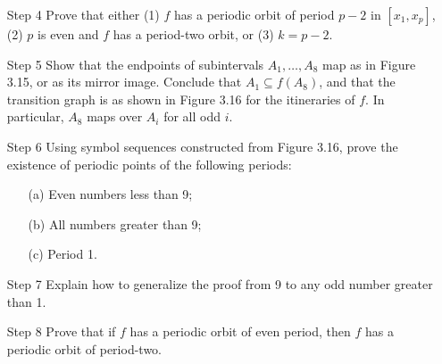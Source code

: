 \documentclass[12pt,letterpaper,reqno]{amsart}
\begin{document}
\begin{enumerate}
\begin{enumerate}
\begin{flushleft}
    \end{flushleft}
    
    \item[Step 4] Prove that either (1) $f$ has a periodic orbit of period $p-2$ in $[x_1, x_p]$, (2) $p$ is even and $f$ has a period-two orbit, or (3) $k = p - 2$.
    \begin{flushleft}
    
    \end{flushleft}
    
    \item[Step 5] Show that the endpoints of subintervals $A_1, \ldots , A_8$ map as in Figure 3.15, or as its mirror image. Conclude that $A_1 \subseteq f(A_8)$, and that the transition graph is as shown in Figure 3.16 for the itineraries of $f$. In particular, $A_8$ maps over $A_i$ for all odd $i$.
    \begin{flushleft}
    
    \end{flushleft}
    
    \item[Step 6] Using symbol sequences constructed from Figure 3.16, prove the existence of periodic points of the following periods:\newline
    \begin{enumerate}
        \item[(a)] Even numbers less than 9;
        \begin{flushleft}
    
        \end{flushleft}
        \item[(b)] All numbers greater than 9;
        \begin{flushleft}
    
        \end{flushleft}
        \item[(c)] Period 1.
        \begin{flushleft}
    
        \end{flushleft}
    \end{enumerate}
    
    \item[Step 7] Explain how to generalize the proof from 9 to any odd number greater than 1.
    \begin{flushleft}
    
    \end{flushleft}
    
    \item[Step 8] Prove that if $f$ has a periodic orbit of even period, then $f$ has a periodic orbit of period-two. 
    \begin{flushleft}
    

\end{flushleft}
\end{enumerate}
\end{enumerate}
\end{document}
